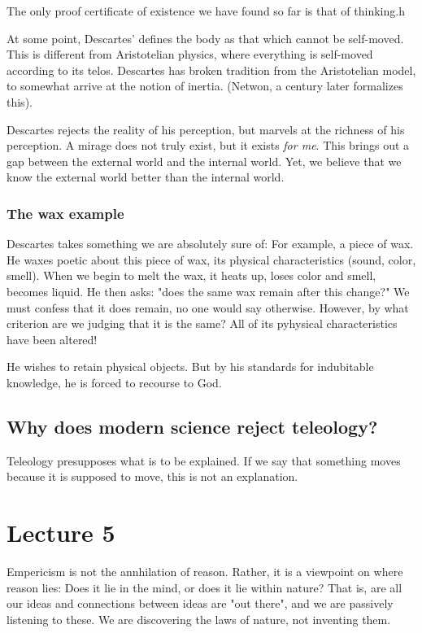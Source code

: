 \documentclass[11pt]{book}
\begin{document}
The only proof certificate of existence we have found so far is
that of thinking.h

At some point, Descartes' defines the body as that which cannot be self-moved.
This is different from Aristotelian physics, where everything is self-moved
according to its telos. Descartes has broken tradition from the Aristotelian
model, to somewhat arrive at the notion of inertia. (Netwon, a century later
formalizes this).

Descartes rejects the reality of his perception, but marvels at the richness of
his perception. A mirage does not truly exist, but it exists \textit{for me}.
This brings out a gap between the external world and the internal world.
Yet, we believe that we know the external world better than the internal world.

\subsubsection{The wax example}
Descartes takes something we are absolutely sure of: For example, a piece of
wax.  He waxes poetic about this piece of wax, its physical characteristics
(sound, color, smell). When we begin to melt the wax, it heats up, loses color
and smell, becomes liquid. He then asks: "does the same wax remain after this
change?" We must confess that it does remain, no one would say otherwise.
However, by what criterion are we judging that it is the same? All of its
pyhysical characteristics have been altered!

He wishes to retain physical objects. But by his standards for indubitable
knowledge, he is forced to recourse to God. 

\subsection{Why does modern science reject teleology?}
Teleology presupposes what is to be explained. If we say that something moves
because it is supposed to move, this is not an explanation.

\section{Lecture 5}
Empericism is not the annhilation of reason. Rather, it is a viewpoint on where
reason lies: Does it lie in the mind, or does it lie within nature? That is,
are all our ideas and connections between ideas are "out there", and we are
passively listening to these. We are discovering the laws of nature, not
inventing them.
\end{document}
